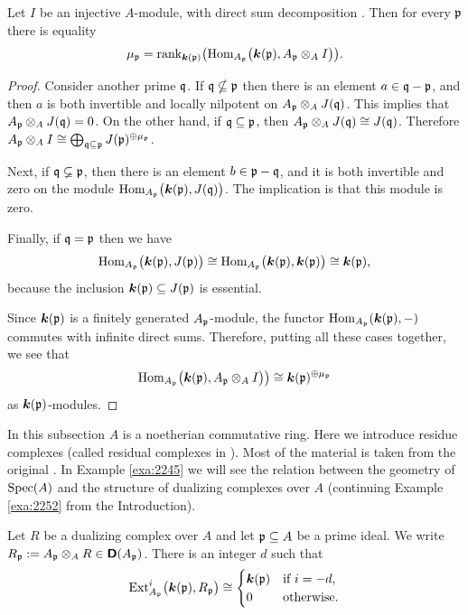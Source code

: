 \begin{prop} \label{prop:2208}
Let $I$ be an injective $A$-module, with direct sum decomposition 
\tup{(\ref{eqn:2215})}.
Then for every $\mathfrak{p}$ there is equality
\[ \mu_{\mathfrak{p}} = \operatorname{rank}_{\boldsymbol{k}(\mathfrak{p})} \bigl( 
\operatorname{Hom}_{A_{\mathfrak{p}}} \bigl( \boldsymbol{k}(\mathfrak{p}) , A_{\mathfrak{p}} \otimes_A I \bigr) \bigr) . \]
\end{prop}

\begin{proof}
Consider another prime $\mathfrak{q}$. If $\mathfrak{q} \nsubseteq \mathfrak{p}$ then there is an element
$a \in \mathfrak{q} - \mathfrak{p}$, and then $a$ is both invertible and locally nilpotent on 
$A_{\mathfrak{p}} \otimes_A J(\mathfrak{q})$. This implies that $A_{\mathfrak{p}} \otimes_A J(\mathfrak{q}) = 0$.
On the other hand, if $\mathfrak{q} \subseteq \mathfrak{p}$, then 
$A_{\mathfrak{p}} \otimes_A J(\mathfrak{q}) \cong J(\mathfrak{q})$. Therefore 
$A_{\mathfrak{p}} \otimes_A I \cong  \bigoplus_{\mathfrak{q} \subseteq \mathfrak{p}} J(\mathfrak{p})^{\oplus \mu_{\mathfrak{p}}}$.

Next, if $\mathfrak{q} \varsubsetneq \mathfrak{p}$, then there is an element $b \in \mathfrak{p} - \mathfrak{q}$, 
and it is both invertible and zero on the module 
$\operatorname{Hom}_{A_{\mathfrak{p}}} \bigl( \boldsymbol{k}(\mathfrak{p}) , J(\mathfrak{q})  \bigr)$.
The implication is that this module is zero.

Finally, if $\mathfrak{q} = \mathfrak{p}$ then we have 
\[ \operatorname{Hom}_{A_{\mathfrak{p}}} \bigl( \boldsymbol{k}(\mathfrak{p}) , J(\mathfrak{p})  \bigr) \cong 
\operatorname{Hom}_{A_{\mathfrak{p}}} \bigl( \boldsymbol{k}(\mathfrak{p}) , \boldsymbol{k}(\mathfrak{p})  \bigr) \cong 
\boldsymbol{k}(\mathfrak{p}) , \]
because the inclusion $\boldsymbol{k}(\mathfrak{p}) \subseteq J(\mathfrak{p})$ is essential. 

Since $\boldsymbol{k}(\mathfrak{p})$ is a finitely generated $A_{\mathfrak{p}}$-module, the functor 
$\operatorname{Hom}_{A_{\mathfrak{p}}}(\boldsymbol{k}(\mathfrak{p}), -)$
commutes with infinite direct sums. Therefore, putting all these cases 
together, we see that 
\[ \operatorname{Hom}_{A_{\mathfrak{p}}} \bigl( \boldsymbol{k}(\mathfrak{p}) , A_{\mathfrak{p}} \otimes_A I \bigr) \bigr) \cong 
\boldsymbol{k}(\mathfrak{p})^{\oplus \mu_{\mathfrak{p}}}  \]
as $\boldsymbol{k}(\mathfrak{p})$-modules.
\end{proof}




 \label{subsec:res-cplx-ring}

In this subsection $A$ is a noetherian commutative ring. 
Here we introduce residue complexes (called residual complexes in \cite{RD}). 
Most of the material is taken from the original \cite{RD}. 
In Example \ref{exa:2245} we will see the relation between the geometry of 
$\operatorname{Spec}(A)$ and the structure of dualizing complexes over $A$ (continuing 
Example \ref{exa:2252} from the Introduction). 

\begin{lem} \label{lem:2200}
Let $R$ be a dualizing complex over $A$ and let $\mathfrak{p} \subseteq A$ be a prime ideal. 
We write 
$R_{\mathfrak{p}} := A_{\mathfrak{p}} \otimes_A R \in \boldsymbol{\mathsf{D}}(A_{\mathfrak{p}})$.
There is an integer $d$ such that 
\[ \operatorname{Ext}^i_{A_{\mathfrak{p}}} \bigl(\boldsymbol{k}(\mathfrak{p}), R_{\mathfrak{p}} \bigr) \cong 
\begin{cases}
\boldsymbol{k}(\mathfrak{p}) & \textup{if} \ i = -d , 
\\
0 & \textup{otherwise} . 
\end{cases} \]
\end{lem}


